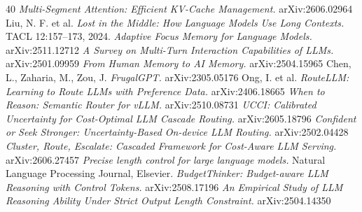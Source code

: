 \documentclass[11pt,a4paper]{article}
\begin{document}
\begin{thebibliography}{40}
 \emph{Multi-Segment Attention: Efficient KV-Cache Management.} arXiv:2606.02964
 Liu, N. F. et al. \emph{Lost in the Middle: How Language Models Use Long Contexts.} TACL 12:157--173, 2024.
 \emph{Adaptive Focus Memory for Language Models.} arXiv:2511.12712
 \emph{A Survey on Multi-Turn Interaction Capabilities of LLMs.} arXiv:2501.09959
 \emph{From Human Memory to AI Memory.} arXiv:2504.15965
 Chen, L., Zaharia, M., Zou, J. \emph{FrugalGPT.} arXiv:2305.05176
 Ong, I. et al. \emph{RouteLLM: Learning to Route LLMs with Preference Data.} arXiv:2406.18665
 \emph{When to Reason: Semantic Router for vLLM.} arXiv:2510.08731
 \emph{UCCI: Calibrated Uncertainty for Cost-Optimal LLM Cascade Routing.} arXiv:2605.18796
 \emph{Confident or Seek Stronger: Uncertainty-Based On-device LLM Routing.} arXiv:2502.04428
 \emph{Cluster, Route, Escalate: Cascaded Framework for Cost-Aware LLM Serving.} arXiv:2606.27457
 \emph{Precise length control for large language models.} Natural Language Processing Journal, Elsevier.
 \emph{BudgetThinker: Budget-aware LLM Reasoning with Control Tokens.} arXiv:2508.17196
 \emph{An Empirical Study of LLM Reasoning Ability Under Strict Output Length Constraint.} arXiv:2504.14350
\end{thebibliography}
\end{document}
